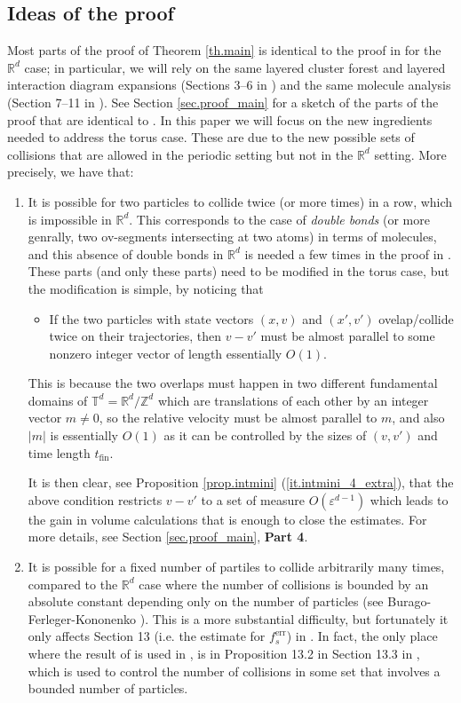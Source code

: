 \documentclass[10pt, reqno]{amsart}
\newcommand{\Rb}{\mathbb R}
\newcommand{\Tb}{\mathbb T}
\newcommand{\Zb}{\mathbb Z}
\theoremstyle{definition}
\theoremstyle{remark}
\numberwithin{equation}{section}
\begin{document}
\subsection{Ideas of the proof} Most parts of the proof of Theorem \ref{th.main} is identical to the proof in \cite{DHM24} for the $\Rb^d$ case; in particular, we will rely on the same layered cluster forest and layered interaction diagram expansions (Sections 3--6 in \cite{DHM24}) and the same molecule analysis (Section 7--11 in \cite{DHM24}). See Section \ref{sec.proof_main} for a sketch of the parts of the proof that are identical to \cite{DHM24}. In this paper we will focus on the new ingredients needed to address the torus case. These are due to the new possible sets of collisions that are allowed in the periodic setting but not in the $\Rb^d$ setting. More precisely, we have that:
\begin{enumerate}
\item It is possible for two particles to collide twice (or more times) in a row, which is impossible in $\Rb^d$. This corresponds to the case of \emph{double bonds} (or more genrally, two ov-segments intersecting at two atoms) in terms of molecules, and this absence of double bonds in $\Rb^d$ is needed a few times in the proof in \cite{DHM24}. These parts (and only these parts) need to be modified in the torus case, but the modification is simple, by noticing that
\begin{itemize}
\item If the two particles with state vectors $(x,v)$ and $(x',v')$ ovelap/collide twice on their trajectories, then $v-v'$ must be almost parallel to some nonzero integer vector of length essentially $O(1)$.
\end{itemize}
This is because the two overlaps must happen in two different fundamental domains of $\Tb^d=\Rb^d/\Zb^d$ which are translations of each other by an integer vector $m\neq 0$, so the relative velocity must be almost parallel to $m$, and also $|m|$ is essentially $O(1)$ as it can be controlled by the sizes of $(v,v')$ and time length $t_{\mathrm{fin}}$.

It is then clear, see Proposition \ref{prop.intmini} (\ref{it.intmini_4_extra}), that the above condition restricts $v-v'$ to a set of measure $O(\varepsilon^{d-1})$ which leads to the gain in volume calculations that is enough to close the estimates. For more details, see Section \ref{sec.proof_main}, \textbf{Part 4}.
\item It is possible for a fixed number of partiles to collide arbitrarily many times, compared to the $\Rb^d$ case where the number of collisions is bounded by an absolute constant depending only on the number of particles (see Burago-Ferleger-Kononenko \cite{BFK98}). This is a more substantial difficulty, but fortunately it only affects Section 13 (i.e. the estimate for $f_s^{\mathrm{err}}$) in \cite{DHM24}. In fact, the only place where the result of \cite{BFK98} is used in \cite{DHM24}, is in Proposition 13.2 in Section 13.3 in \cite{DHM24}, which is used to control the number of collisions in some set that involves a bounded number of particles.


\end{enumerate}
\end{document}
